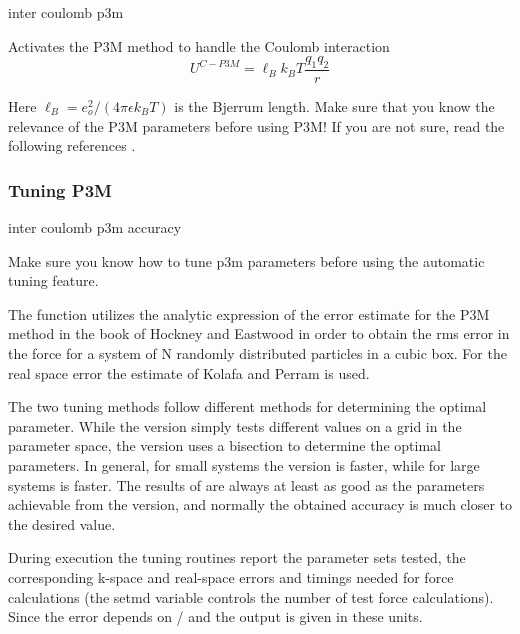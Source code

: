 \begin{essyntax}
  inter coulomb p3m    
\end{essyntax}

Activates the P3M method to handle the Coulomb
interaction
\begin{equation}
  U^{C-P3M} = \ell_B k_B T \frac{q_1 q_2}{r}
\end{equation}

Here $\ell_B = e_o^2 / (4 \pi \epsilon k_B T)$ is the Bjerrum length.
Make sure that you know the relevance of the P3M parameters before
using P3M! If you are not sure, read the following references
\cite{ewald21,hockney88,kolafa92,deserno98,deserno98a,deserno00,deserno00a}.

\subsubsection{Tuning P3M}
\begin{essyntax}
  inter coulomb p3m 
  accuracy \\
\end{essyntax}

Make sure you know how to tune p3m parameters before using the
automatic tuning feature.

The function utilizes the analytic expression of the error estimate
for the P3M method in the book of Hockney and Eastwood \cite[eqn
8.23]{hockney88} in order to obtain the rms error in the force for a
system of N randomly distributed particles in a cubic box.  For the
real space error the estimate of Kolafa and Perram\cite{kolafa92} is
used.

The two tuning methods follow different methods for determining the
optimal parameter. While the  version simply tests
different values on a grid in the parameter space, the
 version uses a bisection to determine the optimal
parameters. In general, for small systems the  version
is faster, while for large systems  is faster. The
results of  are always at least as good as the
parameters achievable from the  version, and normally
the obtained accuracy is much closer to the desired value.

During execution the tuning routines report the parameter sets tested,
the corresponding k-space and real-space errors and timings needed for
force calculations (the setmd variable  controls the
number of test force calculations). Since the error depends on
/ and \var{\alpha} the
output is given in these units.

